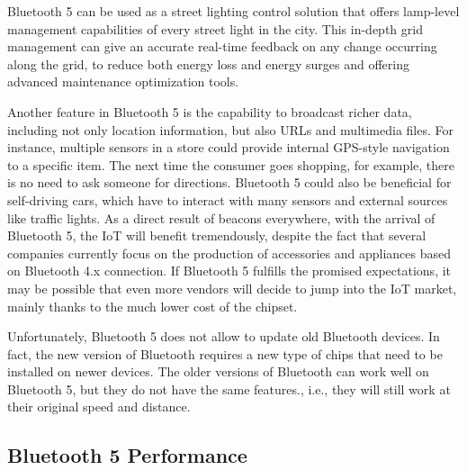 \documentclass[12pt, draftclsnofoot, onecolumn]{IEEEtran}
\begin{document}
Bluetooth 5 can be used as a street lighting control solution that offers lamp-level management capabilities of every street light in the city. This in-depth grid management can give an accurate real-time feedback on any change occurring along the grid, to reduce both energy loss and energy surges and offering advanced maintenance optimization tools. 


Another feature in Bluetooth 5 is the capability to broadcast richer data, including not only location information, but also URLs and multimedia files. For instance, multiple sensors in a store could provide internal GPS-style navigation to a specific item. The next time the consumer goes shopping, for example, there is no need to ask someone for directions. Bluetooth 5 could also be beneficial for self-driving cars, which have to interact with many sensors and external sources like traffic lights. As a direct result of beacons everywhere, with the arrival of Bluetooth 5, the IoT will benefit tremendously, despite the fact that several companies currently focus on the production of accessories and appliances based on Bluetooth 4.x connection. If Bluetooth 5 fulfills the promised expectations, it may be possible that even more vendors will decide to jump into the IoT market, mainly thanks to the much lower cost of the chipset.

Unfortunately, Bluetooth 5 does not allow to update old Bluetooth devices. In fact, the new version of Bluetooth requires a new type of chips that need to be installed on newer devices. The older versions of Bluetooth can work well on Bluetooth 5, but they do not have the same features., i.e., they will still work at their original speed and distance. 

\subsection{Bluetooth 5 Performance}
\label{subsec:btperf}
\end{document}
